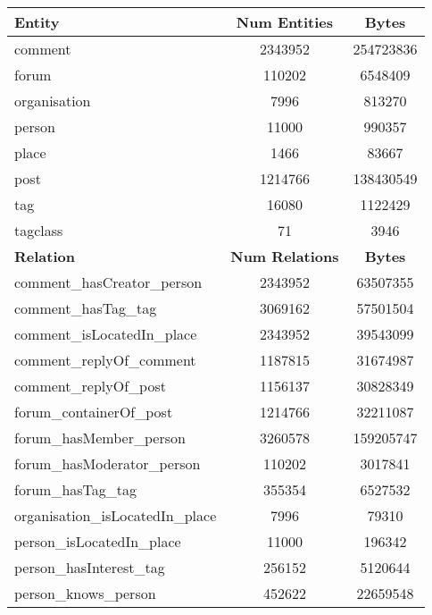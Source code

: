 \begin{table}[H]
    \centering
    \begin{tabular} {| l | c | c |}
        \hline
        \textbf{Entity} & \textbf{Num Entities} & \textbf{Bytes} \\
        \hline
        \hline
        comment & 2343952 & 254723836 \\
        \hline
        forum & 110202 & 6548409 \\
        \hline
        organisation & 7996 & 813270 \\
        \hline
        person & 11000 & 990357 \\
        \hline
        place & 1466 & 83667 \\
        \hline
        post & 1214766 & 138430549 \\
        \hline
        tag & 16080 & 1122429 \\
        \hline
        tagclass & 71 & 3946 \\
        \hline
        \hline
        \textbf{Relation} & \textbf{Num Relations} & \textbf{Bytes} \\
        \hline
        \hline
        comment\_hasCreator\_person & 2343952 & 63507355 \\
        \hline
        comment\_hasTag\_tag & 3069162 & 57501504 \\
        \hline
        comment\_isLocatedIn\_place & 2343952 & 39543099 \\
        \hline
        comment\_replyOf\_comment & 1187815 & 31674987 \\
        \hline
        comment\_replyOf\_post & 1156137 & 30828349 \\
        \hline
        forum\_containerOf\_post & 1214766 & 32211087 \\
        \hline
        forum\_hasMember\_person & 3260578 & 159205747 \\
        \hline
        forum\_hasModerator\_person & 110202 & 3017841 \\
        \hline
        forum\_hasTag\_tag & 355354 & 6527532 \\
        \hline
        organisation\_isLocatedIn\_place & 7996 & 79310 \\
        \hline
        person\_isLocatedIn\_place & 11000 & 196342 \\
        \hline
        person\_hasInterest\_tag & 256152 & 5120644 \\
        \hline
        person\_knows\_person & 452622 & 22659548 \\

\end{tabular}
\end{table}
